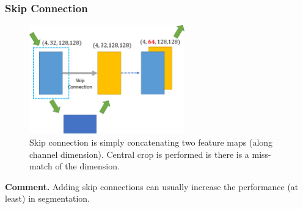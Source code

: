 \documentclass[10pt]{beamer}
\begin{document}
\begin{frame}
	\frametitle{Skip Connection}
	\begin{figure}[H]
	\centerline{
		\includegraphics[width=0.6\textwidth]{skip.png}
	}
	\caption{Skip connection is simply concatenating two feature maps (along channel dimension). Central crop is performed is there is a miss-match of the dimension.}
	\end{figure}	
\vskip -0.2in 
	\textbf{Comment.} Adding skip connections can usually increase the performance (at least) in segmentation.
\end{frame}
\end{document}
